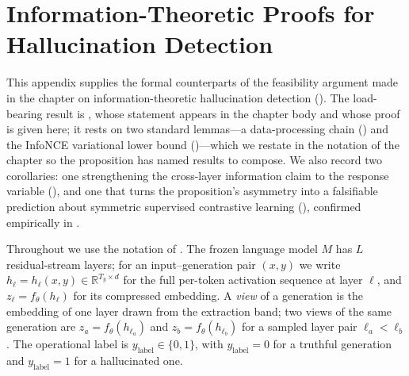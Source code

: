 %
\chapter{Information-Theoretic Proofs for Hallucination Detection}
\label{app:mi-hallucination-proofs}

This appendix supplies the formal counterparts of the feasibility argument made
in the chapter on information-theoretic hallucination detection
(). The load-bearing result is
, whose statement appears in the chapter body and whose
proof is given here; it rests on two standard lemmas---a data-processing chain
() and the InfoNCE variational lower bound
()---which we restate in the notation of the chapter so the
proposition has named results to compose. We also record two corollaries: one
strengthening the cross-layer information claim to the response variable
(), and one that turns the proposition's asymmetry into a
falsifiable prediction about symmetric supervised contrastive learning
(), confirmed empirically in .

Throughout we use the notation of . The frozen language model
$M$ has $L$ residual-stream layers; for an input--generation pair $(x,y)$ we
write $h_\ell = h_\ell(x,y) \in \mathbb{R}^{T_y \times d}$ for the full
per-token activation sequence at layer $\ell$, and $z_\ell = f_\theta(h_\ell)$
for its compressed embedding. A \emph{view} of a generation is the embedding of
one layer drawn from the extraction band; two views of the same generation are
$z_a = f_\theta(h_{\ell_a})$ and $z_b = f_\theta(h_{\ell_b})$ for a sampled layer
pair $\ell_a < \ell_b$. The operational label is
$y_{\mathrm{label}} \in \{0,1\}$, with $y_{\mathrm{label}}=0$ for a truthful
generation and $y_{\mathrm{label}}=1$ for a hallucinated one.


